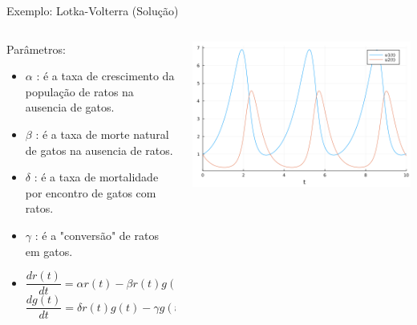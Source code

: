 \documentclass{beamer}
\begin{document}
		\begin{frame}{Exemplo: Lotka-Volterra (Solução)}
			\begin{columns}
				\begin{column}{0.5\textwidth}
					Parâmetros:
					\begin{itemize}[<+->]
						\item $\alpha$ : é a taxa de crescimento da população de ratos na ausencia de gatos. 
						\item $\beta$ : é a taxa de morte natural de gatos na ausencia de ratos.
						\item $\delta$ : é a taxa de mortalidade por encontro de gatos com ratos.
						\item $\gamma$ : é a "conversão" de ratos em gatos.
						\item 
						\begin{equation}
							\frac{dr(t)}{dt}=\alpha r(t) - \beta r(t)g(t)
						\end{equation}
						\begin{equation}
							\frac{dg(t)}{dt}=\delta r(t)g(t) - \gamma g(t)
						\end{equation}
					\end{itemize}

				\end{column}
				\begin{column}{0.5\textwidth}
					\begin{center}
						\includegraphics[width=\textwidth]{Lotka-volterra}
					\end{center}
				\end{column}
			\end{columns}
		\end{frame}
\end{document}
